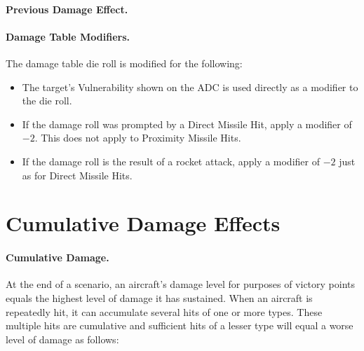 \paragraph{Previous Damage Effect.} 

\paragraph{Damage Table Modifiers.} The damage table die roll is modified for the following:

\begin{itemize}

    \item{} The target's Vulnerability shown on the ADC is used directly as a modifier to the die roll.
    
    \item{} If the damage roll was prompted by a Direct Missile Hit, apply a modifier of $-2$. This does not apply to Proximity Missile Hits.
    
    \item{} If the damage roll is the result of a rocket attack, apply a modifier of $-2$ just as for Direct Missile Hits.
    
\end{itemize}


\section{Cumulative Damage Effects}


\paragraph{Cumulative Damage.} At the end of a scenario, an aircraft's damage level for purposes of victory points equals the highest level of damage it has sustained. When an aircraft is repeatedly hit, it can accumulate several hits of one or more types. These multiple hits are cumulative and sufficient hits of a lesser type will equal a worse level of damage as follows:

